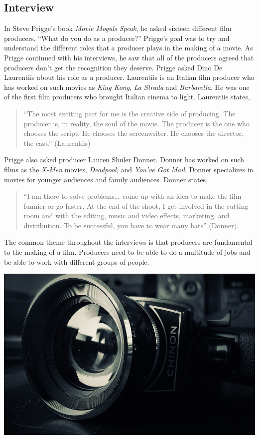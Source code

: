 \begin{multicols}{2}
\section{Interview}
	In Steve Prigge’s book \textit{Movie Moguls Speak}, he asked sixteen different film producers, “What do you do as a producer?” Prigge’s goal was to try and understand the different roles that a producer plays in the making of a movie. As Prigge continued with his interviews, he saw that all of the producers agreed that producers don’t get the recognition they deserve. 
	Prigge asked Dino De Laurentiis about his role as a producer. Laurentiis is an Italian film producer who has worked on such movies as \textit{King Kong}, \textit{La Strada} and \textit{Barbarella}. He was one of the first film producers who brought Italian cinema to light. Laurentiis states, 
\begin{quote}
	“The most exciting part for me is the creative side of producing. The producer is, in reality, the soul of the movie. The producer is the one who chooses the script. He chooses the screenwriter. He chooses the director, the cast.” (Laurentiis) 
\end{quote}
	Prigge also asked producer Lauren Shuler Donner. Donner has worked on such films as the \textit{X-Men} movies, \textit{Deadpool}, and \textit{You’ve Got Mail}. Donner specializes in movies for younger audiences and family audiences. Donner states,
\begin{quote}
	“I am there to solve problems\ldots\ come up with an idea to make the film funnier or go faster. At the end of the shoot, I get involved in the cutting room and with the editing, music and video effects, marketing, and distribution. To be successful, you have to wear many hats” (Donner).
\end{quote}
	The common theme throughout the interviews is that producers are fundamental to the making of a film. Producers need to be able to do a multitude of jobs and be able to work with different groups of people.

\begin{Figure}
 \centering
 \includegraphics[width=\linewidth]{images/Film}
 \label{fig:Film Making}
\end{Figure}


\end{multicols}

